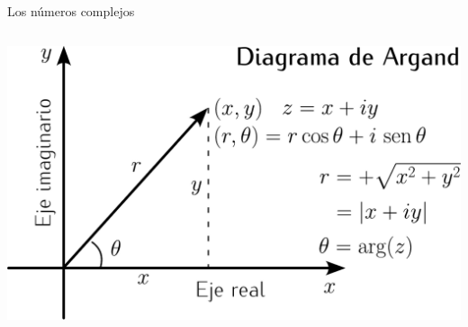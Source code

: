 \documentclass[9pt, aspectratio=169]{beamer}
\begin{document}
\begin{frame}{Los números complejos}
\begin{columns}[t]
		\begin{center}
			\includegraphics[width=1.0\textwidth]{figs/argand.pdf}
		\end{center}
	\end{columns}
\end{frame}
\end{document}
